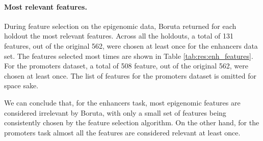 \documentclass{article}
\begin{document}
\paragraph{Most relevant features.} During feature selection on the epigenomic data, Boruta returned for each holdout the most relevant features. Across all the holdouts, a total of 131 features, out of the original 562, were chosen at least once for the enhancers data set. The features selected most times are shown in Table \ref{tab:res:enh_features}. For the promoters dataset, a total of 508 feature, out of the original 562, were chosen at least once. The list of features for the promoters dataset is omitted for space sake.

We can conclude that, for the enhancers task, most epigenomic features are considered irrelevant by Boruta, with only a small set of features being consistently chosen by the feature selection algorithm. On the other hand, for the promoters task almost all the features are considered relevant at least once. 



\medskip



\end{document}

